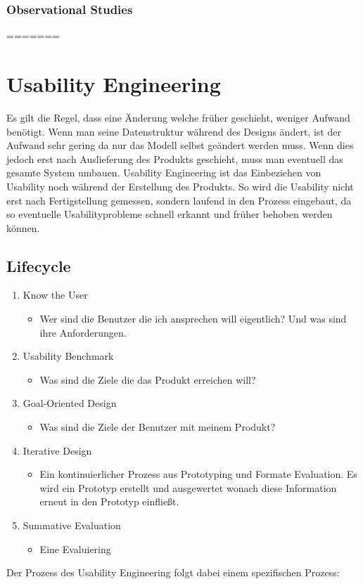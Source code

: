 \documentclass{article}
\begin{document}
	\subsubsection{Observational Studies}



=======
	\section{Usability Engineering}
	Es gilt die Regel, dass eine Änderung welche früher geschieht, weniger Aufwand benötigt. Wenn man seine Datenstruktur während des Designs ändert, ist der Aufwand sehr gering da nur das Modell selbst geändert werden muss. Wenn dies jedoch erst nach Auslieferung des Produkts geschieht, muss man eventuell das gesamte System umbauen. Usability Engineering ist das Einbeziehen von Usability noch während der Erstellung des Produkts. So wird die Usability nicht erst nach Fertigstellung gemessen, sondern laufend in den Prozess eingebaut, da so eventuelle Usabilityprobleme schnell erkannt und früher behoben werden können.
	\subsection{Lifecycle}
	\begin{enumerate}
		\item{Know the User}
		\begin{itemize}
			\item{Wer sind die Benutzer die ich ansprechen will eigentlich? Und was sind ihre Anforderungen.}
		\end{itemize}
		\item{Usability Benchmark}
		\begin{itemize}
			\item{Was sind die Ziele die das Produkt erreichen will?}
		\end{itemize}
		\item{Goal-Oriented Design}
		\begin{itemize}
			\item{Was sind die Ziele der Benutzer mit meinem Produkt?}
		\end{itemize}
		\item{Iterative Design}
		\begin{itemize}
			\item{Ein kontinuierlicher Prozess aus Prototyping und Formate Evaluation. Es wird ein Prototyp erstellt und ausgewertet wonach diese Information erneut in den Prototyp einfließt.}
		\end{itemize}
		\item{Summative Evaluation}
		\begin{itemize}
			\item{Eine Evaluiering }
		\end{itemize}
	\end{enumerate}
	Der Prozess des Usability Engineering folgt dabei einem spezifischen Prozess:
\end{document}
